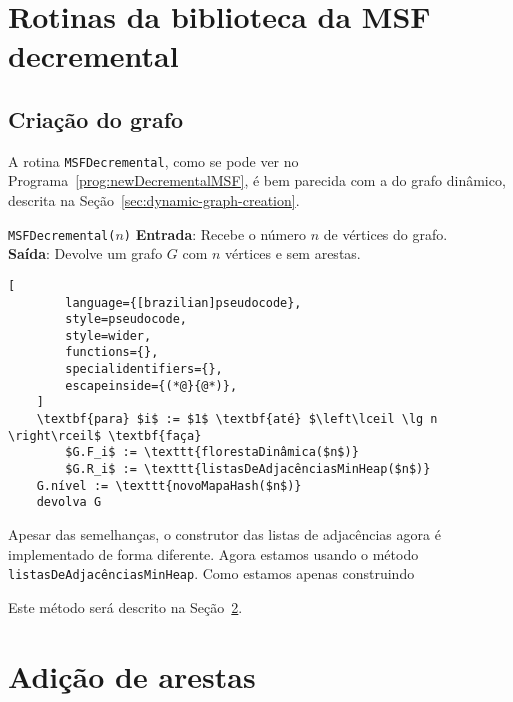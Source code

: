 \section{Rotinas da biblioteca da MSF decremental}

\subsection{Criação do grafo}

A rotina \texttt{MSFDecremental}, como se pode ver no Programa~\ref{prog:newDecrementalMSF}, é bem parecida com a do grafo dinâmico, descrita na Seção~\ref{sec:dynamic-graph-creation}. 

\begin{programruledcaption}{\texttt{MSFDecremental($n$)} \label{prog:newDecrementalMSF}}
    \noindent\textbf{Entrada}: Recebe o número $n$ de vértices do grafo. \\
    \textbf{Saída}: Devolve um grafo $G$ com $n$ vértices e sem arestas.
    \vspace{-0.5\baselineskip}
    \begin{lstlisting}[
        language={[brazilian]pseudocode},
        style=pseudocode,
        style=wider,
        functions={},
        specialidentifiers={},
        escapeinside={(*@}{@*)},
    ]
    \textbf{para} $i$ := $1$ \textbf{até} $\left\lceil \lg n \right\rceil$ \textbf{faça}
        $G.F_i$ := \texttt{florestaDinâmica($n$)}
        $G.R_i$ := \texttt{listasDeAdjacênciasMinHeap($n$)}
    G.nível := \texttt{novoMapaHash($n$)}
    devolva G
    \end{lstlisting}
    \vspace{-0.5\baselineskip}
\end{programruledcaption}

Apesar das semelhanças, o construtor das listas de adjacências agora é implementado de forma diferente. Agora estamos usando o método \texttt{listasDeAdjacênciasMinHeap}. Como estamos apenas construindo 

Este método será descrito na Seção~\ref{sec:edge-addition-DecrementalMSF}. 

\section{Adição de arestas}
\label{sec:edge-addition-DecrementalMSF}
